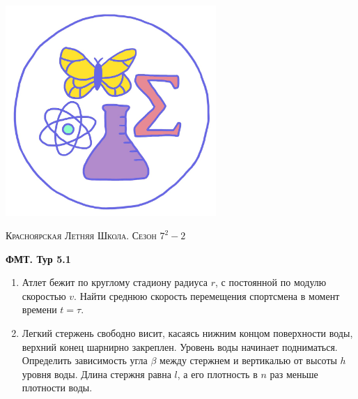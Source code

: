 \colorbox{white!10!}{
    \begin{minipage}{0.2\textwidth}
       \begin{flushleft}
        \includegraphics[width = 0.6\textwidth]{Эмблема.png}
       \end{flushleft}
    \end{minipage}
    \begin{minipage}[t]{0.7 \textwidth}
        \begin{center}
            {\huge \textsc{Красноярская Летняя Школа. Сезон $7^2 - 2$}}
            \vspace{0.25cm}
            
            { \huge \textbf{ФМТ. Тур 5.1}}
        \end{center}
        \vspace{0.05cm}
    \end{minipage}
}

\begin{enumerate}

    \item Атлет бежит по круглому стадиону радиуса $r$, с постоянной по модулю скоростью $v$. Найти среднюю скорость перемещения спортсмена в момент времени $t = \tau$.
    
    \item Легкий стержень свободно висит, касаясь нижним концом поверхности воды, верхний конец шарнирно закреплен. Уровень воды начинает подниматься. Определить зависимость угла $\beta$ между стержнем и вертикалью от высоты $h$ уровня воды. Длина стержня равна $l$, а его плотность в $n$ раз меньше плотности воды.
    
\end{enumerate}